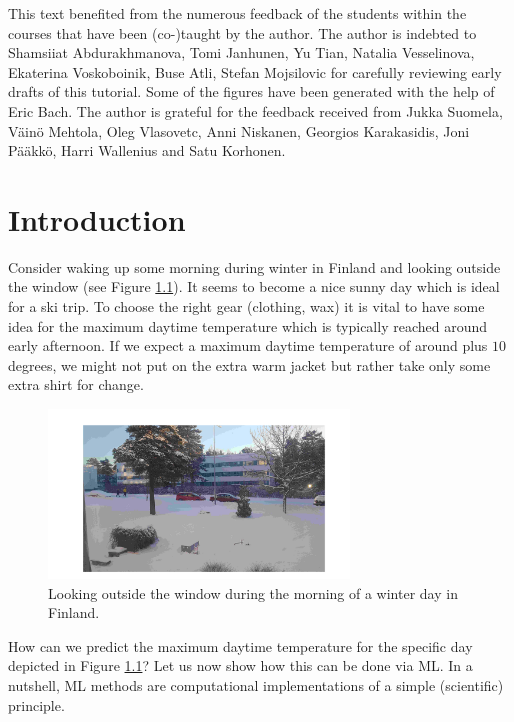 \documentclass[12pt]{report}
\begin{document}
This text benefited from the numerous feedback of the 
students within the courses that have been (co-)taught 
by the author. The author is indebted to Shamsiiat Abdurakhmanova, 
Tomi Janhunen, Yu Tian, Natalia Vesselinova, Ekaterina Voskoboinik, 
Buse Atli, Stefan Mojsilovic for carefully reviewing early 
drafts of this tutorial. Some of the figures have been 
generated with the help of Eric Bach. The author is grateful 
for the feedback received from Jukka Suomela, V{\"a}in{\"o} Mehtola, 
Oleg Vlasovetc, Anni Niskanen, Georgios Karakasidis, Joni P{\"a}{\"a}kk{\"o}, 
Harri Wallenius and Satu Korhonen. 


\tableofcontents                        %


\chapter{Introduction}
Consider waking up some morning during winter in Finland 
and looking outside the window (see Figure \ref{fig:skiday}). 
It seems to become a nice sunny day which is ideal for a 
ski trip. To choose the right gear (clothing, wax) it is 
vital to have some idea for the maximum daytime temperature 
which is typically reached around early afternoon. If we 
expect a maximum daytime temperature of around plus 
$10$ degrees, we might not put on the extra warm jacket 
but rather take only some extra shirt for change. 


\begin{figure}[htbp]
	\centering
	\includegraphics[width=8cm]{SkiDay2.jpeg}
	\caption{Looking outside the window during the morning of a winter day in Finland.}
	\label{fig:skiday}
\end{figure}

How can we predict the maximum daytime temperature for 
the specific day depicted in Figure \ref{fig:skiday}? Let us now 
show how this can be done via ML. In a nutshell, 
ML methods are computational implementations of a simple 
(scientific) principle. 
\end{document}
